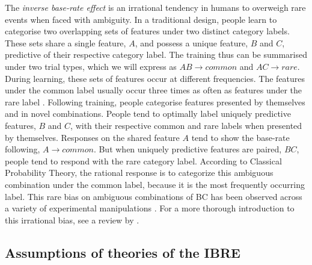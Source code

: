 \documentclass[10pt,letterpaper]{article}
\begin{document}
The \textit{inverse base-rate effect} \cite<IBRE, >{medin1988problem} is an irrational tendency in humans to overweigh rare events when faced with ambiguity.
In a traditional design, people learn to categorise two overlapping sets of features under two distinct category labels.
These sets share a single feature, $A$, and possess a unique feature, $B$ and $C$, predictive of their respective category label.
The training thus can be summarised under two trial types, which we will express as $AB \to common$ and $AC \to rare$.
During learning, these sets of features occur at different frequencies.
The features under the common label usually occur three times as often as features under the rare label \cite{kruschke1996base}.
Following training, people categorise features presented by themselves and in novel combinations.
People tend to optimally label uniquely predictive features, $B$ and $C$, with their respective common and rare labels when presented by themselves.
Responses on the shared feature $A$ tend to show the base-rate following, $A \to common$.
But when uniquely predictive features are paired, $BC$, people tend to respond with the rare category label.
According to Classical Probability Theory, the rational response is to categorize this ambiguous combination under the common label, because it is the most frequently occurring label.
This rare bias on ambiguous combinations of BC has been observed across a variety of experimental manipulations \cite{kalish2001inverse,don2017effects,don2021attention,inkster2022effect,wills2014attention}.
For a more thorough introduction to this irrational bias, see a review by .

\subsection{Assumptions of theories of the IBRE}
\end{document}
